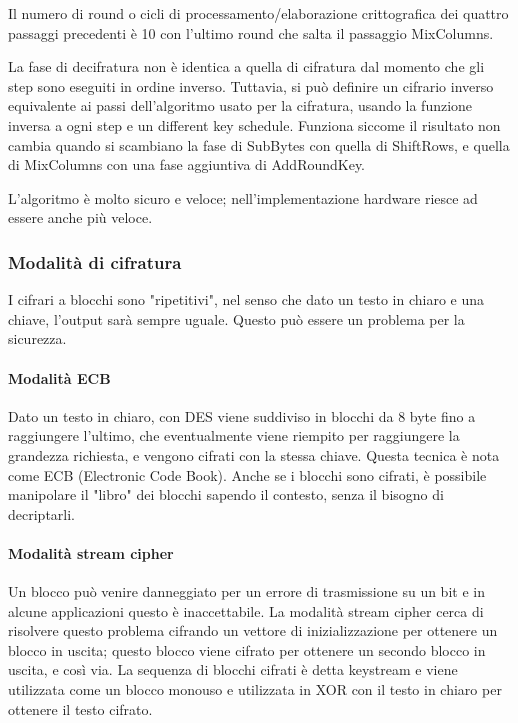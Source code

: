 Il numero di round o cicli di processamento/elaborazione crittografica dei quattro passaggi precedenti è 10 con l'ultimo round che salta il passaggio MixColumns.

La fase di decifratura non è identica a quella di cifratura dal momento che gli step sono eseguiti in ordine inverso.
Tuttavia, si può definire un cifrario inverso equivalente ai passi dell'algoritmo usato per la cifratura, usando la funzione inversa a ogni step e un different key schedule.
Funziona siccome il risultato non cambia quando si scambiano la fase di SubBytes con quella di ShiftRows, e quella di MixColumns con una fase aggiuntiva di AddRoundKey.

L'algoritmo è molto sicuro e veloce; nell'implementazione hardware riesce ad essere anche più veloce.

\subsubsection{Modalità di cifratura}
I cifrari a blocchi sono "ripetitivi", nel senso che dato un testo in chiaro e una chiave, l'output sarà sempre uguale.
Questo può essere un problema per la sicurezza.

\paragraph{Modalità ECB}
Dato un testo in chiaro, con DES viene suddiviso in blocchi da 8 byte fino a raggiungere l'ultimo, che eventualmente viene riempito per raggiungere la grandezza richiesta, e vengono cifrati con la stessa chiave.
Questa tecnica è nota come ECB (Electronic Code Book).
Anche se i blocchi sono cifrati, è possibile manipolare il "libro" dei blocchi sapendo il contesto, senza il bisogno di decriptarli.

\paragraph{Modalità stream cipher}
Un blocco può venire danneggiato per un errore di trasmissione su un bit e in alcune applicazioni questo è inaccettabile.
La modalità stream cipher cerca di risolvere questo problema cifrando un vettore di inizializzazione per ottenere un blocco in uscita;
questo blocco viene cifrato per ottenere un secondo blocco in uscita, e così via.
La sequenza di blocchi cifrati è detta keystream e viene utilizzata come un blocco monouso e utilizzata in XOR con il testo in chiaro per ottenere il testo cifrato.


